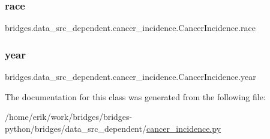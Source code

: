 \subsubsection{\texorpdfstring{race}{race}}
{\footnotesize\ttfamily bridges.\+data\+\_\+src\+\_\+dependent.\+cancer\+\_\+incidence.\+Cancer\+Incidence.\+race}

\mbox{\label{classbridges_1_1data__src__dependent_1_1cancer__incidence_1_1_cancer_incidence_a962b7cd1837e9d964bd01b9e285c7fa9}} 
\subsubsection{\texorpdfstring{year}{year}}
{\footnotesize\ttfamily bridges.\+data\+\_\+src\+\_\+dependent.\+cancer\+\_\+incidence.\+Cancer\+Incidence.\+year}



The documentation for this class was generated from the following file\+:\begin{DoxyCompactItemize}
\item 
/home/erik/work/bridges/bridges-\/python/bridges/data\+\_\+src\+\_\+dependent/\hyperlink{cancer__incidence_8py}{cancer\+\_\+incidence.\+py}\end{DoxyCompactItemize}

